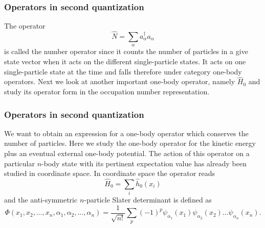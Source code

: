 \frame
{
  \frametitle{Operators in second quantization}
\begin{small}
{\scriptsize
The operator 
\begin{equation}
	\hat{N} = \sum_\alpha a_\alpha^\dagger a_\alpha \label{eq:2-22}
\end{equation}
is called the number operator since it counts the number of particles in a give state vector when it acts 
on the different single-particle states.  It acts on one single-particle state at the time and falls 
therefore under category one-body operators.
Next we look at another important one-body operator, namely $\hat{H}_0$ and study its operator form in the 
occupation number representation.
}
\end{small}
}


\frame
{
  \frametitle{Operators in second quantization}
\begin{small}
{\scriptsize
We want to obtain an expression for a one-body operator which conserves the number of particles.
Here we study the one-body operator for the kinetic energy plus an eventual external one-body potential.
The action of this operator on a particular $n$-body state with its pertinent expectation value has already
been studied in coordinate  space.
In coordinate space the operator reads
\begin{equation}
	\hat{H}_0 = \sum_i \hat{h}_0(x_i) \label{eq:2-23}
\end{equation}
and the anti-symmetric $n$-particle Slater determinant is defined as 
\begin{equation}
\Phi(x_1, x_2,\dots ,x_n,\alpha_1,\alpha_2,\dots, \alpha_n)= \frac{1}{\sqrt{n!}} \sum_p (-1)^p
		\psi_{\alpha_1}(x_1)\psi_{\alpha_2}(x_2) \dots \psi_{\alpha_n}(x_n).\label{eq:2-24}
\end{equation}
}
\end{small}
}


